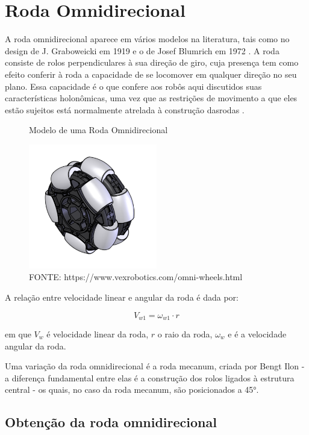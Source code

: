 
\section{Roda Omnidirecional}

A roda omnidirecional aparece em vários modelos na literatura, tais como no design de J. Graboweicki em 1919
\cite{patent_US1305535A} e o de Josef Blumrich em 1972 \cite{patent_US3789947A}. A roda consiste de rolos
perpendiculares à  sua direção de giro, cuja presença tem como efeito conferir à roda a capacidade de se locomover em
qualquer direção no seu plano. Essa capacidade é o que confere aos robôs aqui discutidos suas características
holonômicas, uma vez que as restrições de movimento a que eles estão sujeitos está normalmente atrelada à construção dasrodas \cite{TAKAHASHI}.

\begin{figure}[h]
	\centering
	\caption{Modelo de uma Roda Omnidirecional}
	\includegraphics[width=0.5\textwidth]{figures/omniwheel}
    \caption*{FONTE: https://www.vexrobotics.com/omni-wheels.html}
\end{figure}

A relação entre velocidade linear e angular da roda é dada por:

\[V_{w1} = \omega_{w1}\cdot r \] 

em que $V_{w}$ é velocidade linear da roda, $r$ o raio da roda, $\omega_{w} $ e é a velocidade angular da roda.

Uma variação da roda omnidirecional é a roda mecanum, criada por Bengt Ilon \cite{patent_US3876255A} - 
a diferença fundamental entre elas é a construção dos rolos ligados à estrutura central  -
os quais, no caso da roda mecanum, são posicionados a 45°.

\subsection{Obtenção da roda omnidirecional}

